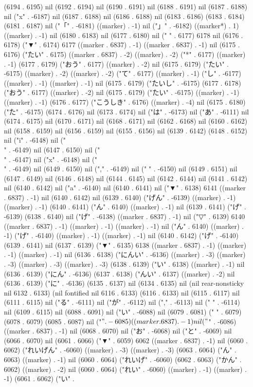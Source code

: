 (6194 . 6195) nil (6192 . 6194) nil (6190 . 6191) nil (6188 . 6191) nil (6187 . 6188) nil ("x" . -6187) nil (6187 . 6188) nil (6186 . 6188) nil (6183 . 6186) (6183 . 6184) (6181 . 6187) nil ("「" . -6181) ((marker) . -1) nil ("」" . -6182) ((marker*) . 1) ((marker) . -1) nil (6180 . 6183) nil (6177 . 6180) nil (" " . 6177) 6178 nil (6176 . 6178) ("▼" . 6174) 6177 ((marker . 6837) . -1) ((marker . 6837) . -1) nil (6175 . 6176) ("たい" . 6175) ((marker . 6837) . -2) ((marker) . -2) ("*" . 6177) ((marker) . -1) (6177 . 6179) ("おう" . 6177) ((marker) . -2) nil (6175 . 6179) ("たい" . -6175) ((marker) . -2) ((marker) . -2) ("て" . 6177) ((marker) . -1) ("し" . -6177) ((marker) . -1) ((marker) . -1) nil (6175 . 6179) ("たいし" . -6175) (6177 . 6178) ("おう" . 6177) ((marker) . -2) nil (6175 . 6179) ("たい" . -6175) ((marker) . -1) ((marker) . -1) (6176 . 6177) ("こうしき" . 6176) ((marker) . -4) nil (6175 . 6180) ("た" . -6175) (6174 . 6176) nil (6173 . 6174) nil ("は" . -6173) nil ("あ" . -6111) nil (6174 . 6175) nil (6170 . 6171) nil (6168 . 6171) nil (6162 . 6168) nil (6160 . 6162) nil (6158 . 6159) nil (6156 . 6159) nil (6155 . 6156) nil (6139 . 6142) (6148 . 6152) nil ("i" . -6148) nil ("\\" . -6149) nil (6147 . 6150) nil ("\\" . -6147) nil ("x" . -6148) nil ("\\" . -6149) nil (6149 . 6150) nil ("," . -6149) nil (" " . -6150) nil (6149 . 6151) nil (6147 . 6149) nil (6146 . 6148) nil (6144 . 6145) nil (6142 . 6144) nil (6141 . 6142) nil (6140 . 6142) nil ("a" . -6140) nil (6140 . 6141) nil ("▼" . 6138) 6141 ((marker . 6837) . -1) nil (6140 . 6142) nil (6139 . 6140) ("げん" . -6139) ((marker) . -1) ((marker) . -1) (6140 . 6141) ("ん" . 6140) ((marker) . -1) nil (6139 . 6141) ("げ" . -6139) (6138 . 6140) nil ("げ" . -6138) ((marker . 6837) . -1) nil ("▽" . 6139) 6140 ((marker . 6837) . -1) ((marker) . -1) ((marker) . -1) nil ("ん" . 6140) ((marker) . -1) ("げ" . -6140) ((marker) . -1) ((marker) . -1) nil (6140 . 6142) ("げ" . -6140) (6139 . 6141) nil (6137 . 6139) ("▼" . 6135) 6138 ((marker . 6837) . -1) ((marker) . -1) ((marker) . -1) nil (6136 . 6138) ("にんい" . -6136) ((marker) . -3) ((marker) . -3) ((marker) . -3) ((marker) . -3) (6138 . 6139) ("い" . 6138) ((marker) . -1) nil (6136 . 6139) ("にん" . -6136) (6137 . 6138) ("んい" . 6137) ((marker) . -2) nil (6136 . 6139) ("に" . -6136) (6135 . 6137) nil (6134 . 6135) nil (nil rear-nonsticky nil 6132 . 6133) (nil fontified nil 6116 . 6133) (6116 . 6133) nil (6115 . 6117) nil (6111 . 6115) nil ("る" . -6111) nil ("が" . -6112) nil ("," . -6113) nil (" " . -6114) nil (6109 . 6115) nil (6088 . 6091) nil ("い" . -6088) nil (6079 . 6081) (" " . 6079) (6078 . 6079) (6085 . 6087) nil ("$" . -6085) ((marker . 6837) . -1) nil ("$" . -6086) ((marker . 6837) . -1) nil (6068 . 6070) nil ("お" . -6068) nil ("と" . -6069) nil (6066 . 6070) nil (6061 . 6066) ("▼" . 6059) 6062 ((marker . 6837) . -1) nil (6060 . 6062) ("れいげん" . -6060) ((marker) . -3) ((marker) . -3) (6063 . 6064) ("ん" . 6063) ((marker) . -1) nil (6060 . 6064) ("れいげ" . -6060) (6062 . 6063) ("かん" . 6062) ((marker) . -2) nil (6060 . 6064) ("れい" . -6060) ((marker) . -1) ((marker) . -1) (6061 . 6062) ("い" . 